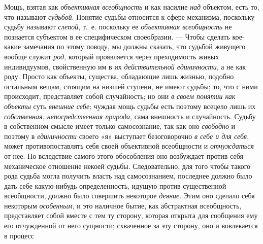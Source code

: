 \documentclass[twoside]{article}
\begin{document}
{{{{{Мощь, взятая как
{\em объективная всеобщность}
и как насилие {\em над}
объектом, есть то, что называют
{\em судьбой}. Понятие
судьбы относится к сфере механизма, поскольку судьбу называют
{\em слепой}, т.~е.
поскольку ее {\em объективная
всеобщность} не познается субъектом в ее специфическом
своеобразии. — Чтобы сделать кое-какие замечания
по этому поводу, мы должны сказать, что судьбой живущего вообще служит
{\em род}, который
проявляется через преходимость живых индивидуумов, свойственную им в их
{\em действительной единичности},
а не как роду. Просто как объекты, существа, обладающие лишь
жизнью, подобно остальным вещам, стоящим на низшей ступени, не имеют
судьбы; то, что с ними происходит, представляет собой случайность; но они
{\em в своем понятии как объекты}
суть {\em внешние себе};
чуждая мощь судьбы есть поэтому всецело лишь их
{\em собственная, непосредственная
природа}, сама внешность и случайность. Судьбу в собственном
смысле имеет только самосознание, так как оно
{\em свободно} и поэтому
в {\em единичности}
своего «я» выступает безоговорочно
{\em в себе и для себя},
может противопоставлять себя своей объективной всеобщности и
{\em отчуждаться} от нее.
Но вследствие самого этого обособления оно возбуждает против
себя механическое отношение некоей судьбы. Следовательно, для того чтобы
такого рода судьба могла получить власть над самосознанием, последнее
должно было дать себе какую-нибудь определенность, идущую против
существенной всеобщности, должно было совершить некоторое
{\em деяние}. Этим оно
сделало себя некоторым {\em особенным},
и это наличное бытие, как абстрактная всеобщность,
представляет собой вместе с тем ту сторону, которая открыта для сообщения
ему его отчужденной от него сущности; схваченное за эту сторону, оно и
вовлекается в
процесс~}}}}}
\end{document}
